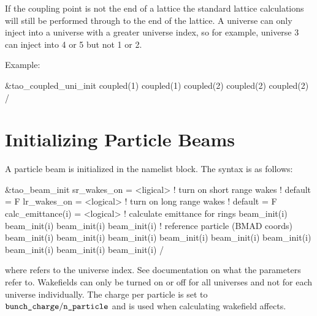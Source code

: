 If the coupling point is not the end of a lattice the standard lattice
calculations will still be performed through to the end of the lattice.
A universe can only inject into a universe with a
greater universe index, so for example, universe 3 can inject into 4 or 5 but
not 1 or 2.

Example:
\begin{example}
  &tao_coupled_uni_init
    coupled(1)%
    coupled(1)%
    coupled(2)%
    coupled(2)%
    coupled(2)%
  /
\end{example}

\section{Initializing Particle Beams}
\label{s:beam_init}

A particle beam is initialized in the  namelist block.
The syntax is as follows:
\begin{example}
  &tao_beam_init
    sr_wakes_on             = <ligical>   ! turn on short range wakes
                                          ! default = F
    lr_wakes_on             = <logical>   ! turn on long range wakes
                                          ! default = F
    calc_emittance(i)       = <logical>   ! calculate emittance for rings
    beam_init(i)%
    beam_init(i)%
    beam_init(i)%
    beam_init(i)%
                                         ! reference particle (BMAD coords)
    beam_init(i)%
    beam_init(i)%
    beam_init(i)%
    beam_init(i)%
    beam_init(i)%
    beam_init(i)%
    beam_init(i)%
    beam_init(i)%
    beam_init(i)%
  /
\end{example}
where  refers to the universe index. See \bmad documentation on what the
 parameters refer to. Wakefields can only be turned on or off for all
universes and not for each universe individually. The charge per particle is set
to $\vn{bunch_charge} / \vn{n_particle}$ and is used when calculating
wakefield affects.


